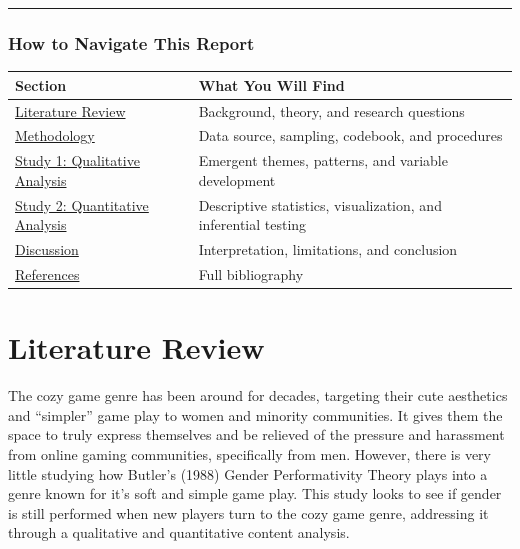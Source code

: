 \documentclass[
  12pt,
  letterpaper,
  DIV=11,
  numbers=noendperiod]{scrreprt}
\newcounter{none} %
\begin{document}
\begin{center}\rule{0.5\linewidth}{0.5pt}\end{center}

\subsection{How to Navigate This
Report}\label{how-to-navigate-this-report}

{\def\LTcaptype{none} %
\begin{longtable}[]{@{}
  >{\raggedright\arraybackslash}p{}
  >{\raggedright\arraybackslash}p{}@{}}
\toprule\noalign{}
\begin{minipage}[b]{\linewidth}\raggedright
Section
\end{minipage} & \begin{minipage}[b]{\linewidth}\raggedright
What You Will Find
\end{minipage} \\
\midrule\noalign{}
\endhead
\bottomrule\noalign{}
\endlastfoot
\href{01-literature-review.qmd}{Literature Review} & Background, theory,
and research questions \\
\href{02-methodology.qmd}{Methodology} & Data source, sampling,
codebook, and procedures \\
\href{03-study-1.qmd}{Study 1: Qualitative Analysis} & Emergent themes,
patterns, and variable development \\
\href{04-study-2.qmd}{Study 2: Quantitative Analysis} & Descriptive
statistics, visualization, and inferential testing \\
\href{05-discussion.qmd}{Discussion} & Interpretation, limitations, and
conclusion \\
\href{references.qmd}{References} & Full bibliography \\
\end{longtable}
}


\chapter{Literature Review}\label{literature-review}

The cozy game genre has been around for decades, targeting their cute
aesthetics and ``simpler'' game play to women and minority communities.
It gives them the space to truly express themselves and be relieved of
the pressure and harassment from online gaming communities, specifically
from men. However, there is very little studying how Butler's (1988)
Gender Performativity Theory plays into a genre known for it's soft and
simple game play. This study looks to see if gender is still performed
when new players turn to the cozy game genre, addressing it through a
qualitative and quantitative content analysis.
\end{document}
